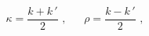 \begin{equation}\label{kappa}
\kappa= \frac{k+k\,'}{2}\,\,,~~~~~~~\rho=\frac{k-k\,'}{2}\,\,,
\end{equation}

